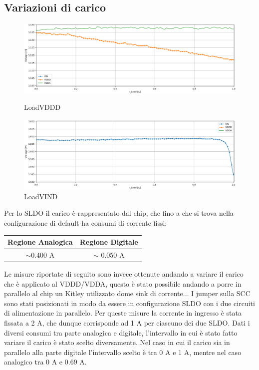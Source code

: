 \subsection{Variazioni di carico}
\begin{figure}
\centering
\includegraphics[width=\textwidth]{Immagini/LoadVDDD}
\caption{LoadVDDD}
\label{LoadVDDD}
\includegraphics[width=\textwidth]{Immagini/LoadVIND}
\caption{LoadVIND}
\label{LoadVIND}
\end{figure}
Per lo SLDO il carico è rappresentato dal chip, che fino a che si trova nella configurazione di default ha consumi di corrente fissi:
\begin{center}
\begin{tabular}{cc}
\hline
Regione Analogica & Regione Digitale \\ \hline
$\sim$0.400 A & $\sim$ 0.050 A\\ \hline     
\end{tabular}
\end{center}
Le misure riportate di seguito sono invece ottenute andando a variare il carico che è applicato al VDDD/VDDA, questo è stato possibile andando a porre in parallelo al chip un Kitley utilizzato dome sink di corrente... I jumper sulla SCC sono stati posizionati in modo da essere in configurazione SLDO con i due circuiti di alimentazione in parallelo. 
Per queste misure la corrente in ingresso è stata fissata a 2 A, che dunque corrisponde ad 1 A per ciascuno dei due SLDO. 
Dati i diversi consumi tra parte analogica e digitale, l'intervallo in cui è stato fatto variare il carico è stato scelto diversamente. Nel caso in cui il carico sia in parallelo alla parte digitale l'intervallo scelto è tra 0 A e 1 A, mentre nel caso analogico tra 0 A e 0.69 A. 
